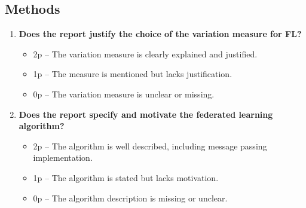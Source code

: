 \documentclass{article}
\begin{document}
	\subsection{Methods}
		\begin{enumerate}[resume]
		\item \textbf{Does the report justify the choice of the variation measure for FL?}  
		\begin{itemize}
			\item 2p – The variation measure is clearly explained and justified.
			\item 1p – The measure is mentioned but lacks justification.
			\item 0p – The variation measure is unclear or missing.
		\end{itemize}
		
		\item \textbf{Does the report specify and motivate the federated learning algorithm?}  
		\begin{itemize}
			\item 2p – The algorithm is well described, including message passing implementation.
			\item 1p – The algorithm is stated but lacks motivation.
			\item 0p – The algorithm description is missing or unclear.
		\end{itemize}
	\end{enumerate}
	
\end{document}
